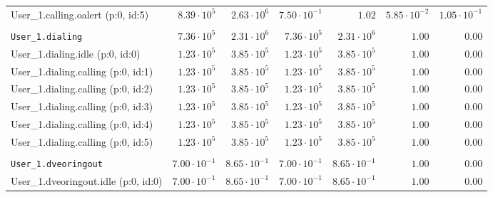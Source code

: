 \begin{table}[htbp]
{\begin{tabular}{lrrrrrr}
\hspace{3mm}User\_1.calling.oalert (p:0, id:5)       &  $8.39 \cdot 10^{5}$ &  $2.63 \cdot 10^{6}$ & $7.50 \cdot 10^{-1}$ &               $1.02$ & $5.85 \cdot 10^{-2}$ & $1.05 \cdot 10^{-1}$ \\
\\[-8pt]\texttt{User\_1.dialing}                     &  $7.36 \cdot 10^{5}$ &  $2.31 \cdot 10^{6}$ &  $7.36 \cdot 10^{5}$ &  $2.31 \cdot 10^{6}$ &               $1.00$ &               $0.00$ \\
\hspace{3mm}User\_1.dialing.idle (p:0, id:0)         &  $1.23 \cdot 10^{5}$ &  $3.85 \cdot 10^{5}$ &  $1.23 \cdot 10^{5}$ &  $3.85 \cdot 10^{5}$ &               $1.00$ &               $0.00$ \\
\hspace{3mm}User\_1.dialing.calling (p:0, id:1)      &  $1.23 \cdot 10^{5}$ &  $3.85 \cdot 10^{5}$ &  $1.23 \cdot 10^{5}$ &  $3.85 \cdot 10^{5}$ &               $1.00$ &               $0.00$ \\
\hspace{3mm}User\_1.dialing.calling (p:0, id:2)      &  $1.23 \cdot 10^{5}$ &  $3.85 \cdot 10^{5}$ &  $1.23 \cdot 10^{5}$ &  $3.85 \cdot 10^{5}$ &               $1.00$ &               $0.00$ \\
\hspace{3mm}User\_1.dialing.calling (p:0, id:3)      &  $1.23 \cdot 10^{5}$ &  $3.85 \cdot 10^{5}$ &  $1.23 \cdot 10^{5}$ &  $3.85 \cdot 10^{5}$ &               $1.00$ &               $0.00$ \\
\hspace{3mm}User\_1.dialing.calling (p:0, id:4)      &  $1.23 \cdot 10^{5}$ &  $3.85 \cdot 10^{5}$ &  $1.23 \cdot 10^{5}$ &  $3.85 \cdot 10^{5}$ &               $1.00$ &               $0.00$ \\
\hspace{3mm}User\_1.dialing.calling (p:0, id:5)      &  $1.23 \cdot 10^{5}$ &  $3.85 \cdot 10^{5}$ &  $1.23 \cdot 10^{5}$ &  $3.85 \cdot 10^{5}$ &               $1.00$ &               $0.00$ \\
\\[-8pt]\texttt{User\_1.dveoringout}                 & $7.00 \cdot 10^{-1}$ & $8.65 \cdot 10^{-1}$ & $7.00 \cdot 10^{-1}$ & $8.65 \cdot 10^{-1}$ &               $1.00$ &               $0.00$ \\
\hspace{3mm}User\_1.dveoringout.idle (p:0, id:0)     & $7.00 \cdot 10^{-1}$ & $8.65 \cdot 10^{-1}$ & $7.00 \cdot 10^{-1}$ & $8.65 \cdot 10^{-1}$ &               $1.00$ &               $0.00$ \\

\end{tabular}}
\end{table}
